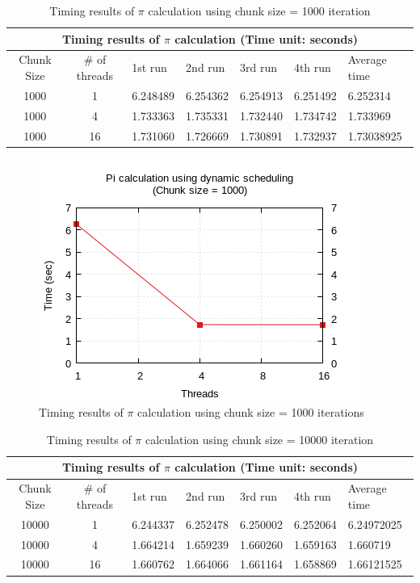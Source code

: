 \documentclass{article}
\begin{document}

\begin{table}[htbp]
  \centering
    \begin{tabular}{|c c||l l l l| l|} 
    \hline
    \multicolumn{7}{|c|}{Timing results of $\pi$ calculation (Time unit: seconds)} \\
    \hline
    Chunk Size & \# of threads & 1st run & 2nd run & 3rd run & 4th run & Average time\\ [0.5ex] 
    \hline\hline
    1000 & 1 & 6.248489 & 6.254362 & 6.254913 & 6.251492 & 6.252314 \\
    \hline
    1000 & 4 & 1.733363 & 1.735331 & 1.732440 & 1.734742 & 1.733969 \\
    \hline
    1000 & 16 & 1.731060 & 1.726669 & 1.730891 & 1.732937 & 1.73038925 \\ [1ex]
    \hline
    \end{tabular}
  \caption{Timing results of $\pi$ calculation using chunk size = 1000 iteration}
\end{table}

\begin{figure}[htbp]
  \centering
  \includegraphics[width=0.55\columnwidth]{../ex1/plots/pi_c1000.png}
  \caption{Timing results of $\pi$ calculation using chunk size = 1000 iterations}
\end{figure}



\begin{table}[htbp]
  \centering
    \begin{tabular}{|c c||l l l l| l|} 
    \hline
    \multicolumn{7}{|c|}{Timing results of $\pi$ calculation (Time unit: seconds)} \\
    \hline
    Chunk Size & \# of threads & 1st run & 2nd run & 3rd run & 4th run & Average time\\ [0.5ex] 
    \hline\hline
    10000 & 1 & 6.244337 & 6.252478 & 6.250002 & 6.252064 & 6.24972025 \\
    \hline
    10000 & 4 & 1.664214 & 1.659239 & 1.660260 & 1.659163 & 1.660719 \\
    \hline
    10000 & 16 & 1.660762 & 1.664066 & 1.661164 & 1.658869 & 1.66121525 \\ [1ex]
    \hline
    \end{tabular}
  \caption{Timing results of $\pi$ calculation using chunk size = 10000 iteration}
\end{table}
\end{document}

